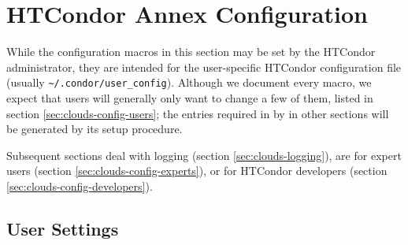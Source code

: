 \section{\label{sec:clouds-config}HTCondor Annex Configuration}

While the configuration macros in this section may be set by the HTCondor
administrator, they are intended for the user-specific HTCondor configuration
file (usually {\tt \textasciitilde/.condor/user\_config}).  Although we
document every macro, we expect that users will generally only want to
change a few of them, listed in section \ref{sec:clouds-config-users};
the entries required in by  in other sections will be
generated by its setup procedure.

Subsequent sections deal with logging
(section \ref{sec:clouds-logging}),
are for expert users
(section \ref{sec:clouds-config-experts}),
or for HTCondor developers
(section \ref{sec:clouds-config-developers}).

\subsection{\label{sec:clouds-config-users}User Settings}

